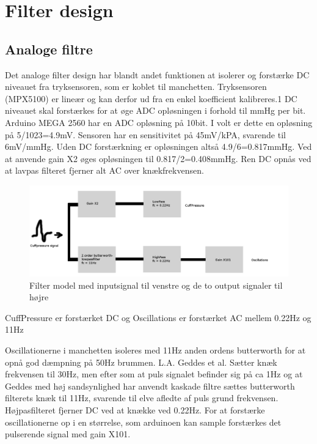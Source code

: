 \newpage
\chapter{Filter design} \label{title:filters}

\section{Analoge filtre}

Det analoge filter design har blandt andet funktionen at isolerer og forstærke DC niveauet fra tryksensoren, som er koblet til manchetten. Tryksensoren (MPX5100) er lineær og kan derfor ud fra en enkel koefficient kalibreres.1 DC niveauet skal forstærkes for at øge ADC opløsningen i forhold til mmHg per bit. Arduino MEGA 2560 har en ADC opløsning på 10bit. I volt er dette en opløsning på 5/1023=4.9mV. Sensoren har en sensitivitet på 45mV/kPA, svarende til 6mV/mmHg. Uden DC forstærkning er opløsningen altså 4.9/6=0.817mmHg. Ved at anvende gain X2 øges opløsningen til 0.817/2=0.408mmHg. Ren DC opnås ved at lavpas filteret fjerner alt AC over knækfrekvensen.

\begin{figure}[H]
	\includegraphics[width=\textwidth]{Implementeringsdokument/billeder/AnalogFilter.png}
	\caption{Filter model med inputsignal til venstre og de to output signaler	til højre}\label{pic:analogfilter}
\end{figure}
CuffPressure er forstærket DC og Oscillations er forstærket AC mellem 0.22Hz og 11Hz

Oscillationerne i manchetten isoleres med 11Hz anden ordens butterworth for at opnå god dæmpning på 50Hz brummen. L.A. Geddes et al. Sætter knæk frekvensen til 30Hz, men efter som at puls signalet befinder sig på ca 1Hz og at Geddes med høj sandsynlighed har anvendt kaskade filtre sættes butterworth filterets knæk til 11Hz, svarende til elve afledte af puls grund frekvensen. Højpasfilteret fjerner DC ved at knække ved 0.22Hz. For at forstærke oscillationerne op i en størrelse, som arduinoen kan sample forstærkes det pulserende signal med gain X101.

